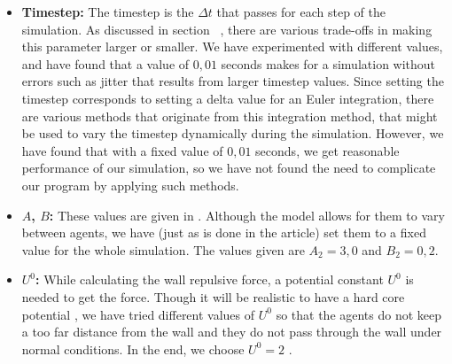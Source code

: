 \begin{itemize}
    \item \textbf{Timestep:} The timestep is the $\Delta t$ that passes for 
        each step of the simulation. As discussed in 
        section~ %
		, there are various trade-offs in making 
        this parameter larger or smaller. We have experimented with different 
        values, and have found that a value of $0,01$ seconds makes for a 
        simulation without errors such as jitter that results from larger 
        timestep values. Since setting the timestep corresponds to setting a 
        delta value for an Euler integration, there are various methods that 
        originate from this integration method, that might be used to vary the 
        timestep dynamically during the simulation. 
         However, we have found 
        that with a fixed value of $0,01$ seconds, we get reasonable 
        performance of our simulation, so we have not found the need to 
        complicate our program by applying such methods.

    \item \textbf{$A$, $B$:} These values are given in \cite{ABconstant}. 
        Although the model allows for them to vary between agents, we have 
        (just as is done in the article) set them to a fixed value for the 
        whole simulation. The values given are $A_2=3,0$ and $B_2 = 0,2$.

    \item \textbf{$ U^{0} $:} While calculating the wall repulsive force, a potential
        constant $ U^{0} $ is needed to get the force. Though it will be realistic to 
        have a hard core potential \cite{self-org}, we have tried different values 
        of $ U^{0} $ so that the agents do not keep a too far distance from the wall 
        and they do not pass through the wall under normal conditions. In the end, 
        we choose $ U^{0} =2 $ .
 
\end{itemize}

